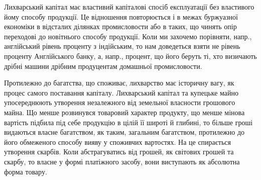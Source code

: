 Лихварський капітал має властивий капіталові спосіб експлуатації без
властивого йому способу продукції. Це відношення повторюється і в межах буржуазної
економіки в відсталих ділянках промисловости або в таких, що чинять
опір переходові до новітнього способу продукції. Коли ми захочемо порівняти,
напр., англійський рівень проценту з індійським, то нам доведеться взяти не
рівень проценту Англійського банку, а, напр., процент, що його беруть ті, хто
визичають дрібні машини дрібним продуцентам домашньої промисловости.

Протилежно до багатства, що споживає, лихварство має історичну вагу,
як процес самого поставання капіталу. Лихварський капітал та купецьке
майно упосереднюють утворення незалежного від земельної власности грошового
майна. Що менше розвинувся товаровий характер продукту, що менше мінова
вартість підбила під себе продукцію в цілій її широті й глибині, то більше гроші видаються
власне багатством, як таким, загальним багатством, протилежно до його
обмеженого способу вияву у споживчих вартостях. На це спирається утворення
скарбів. Коли абстрагуватись від грошей, як світових грошей та скарбу, то
власне у формі платіжного засобу, вони виступають як абсолютна форма товару.
\parbreak{}  %
